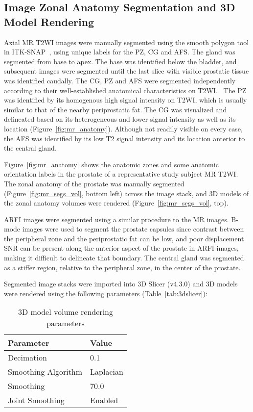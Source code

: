\subsection{Image Zonal Anatomy Segmentation and 3D Model Rendering}
Axial MR T2WI images were manually segmented using the smooth polygon tool in
ITK-SNAP~\cite{Yushkevich2006}, using unique labels for the PZ, CG and AFS. The
gland was segmented from base to apex.  The base was identified below the
bladder, and subsequent images were segmented until the last slice with visible
prostatic tissue was identified caudally. The CG, PZ and AFS were segmented
independently according to their well-established anatomical characteristics on
T2WI.~\cite{Verma2011,Jung2012,Poon1985,Hricak2007,Bonekamp2011} The PZ was
identified by its homogenous high signal intensity on T2WI, which is usually
similar to that of the nearby periprostatic fat. The CG was visualized and
delineated based on its heterogeneous and lower signal intensity as well as its
location (Figure~\ref{fig:mr_anatomy}). Although not readily visible on every
case, the AFS was identified by its low T2 signal intensity and its location
anterior to the central gland. 

Figure~\ref{fig:mr_anatomy} shows the anatomic zones and some anatomic
orientation labels in the prostate of a representative study subject MR T2WI.  The
zonal anatomy of the prostate was manually segmented
(Figure~\ref{fig:mr_segs_vol}, bottom left) across the image stack, and 3D
models of the zonal anatomy volumes were rendered
(Figure~\ref{fig:mr_segs_vol}, top).





ARFI images were segmented using a similar procedure to the MR images.  B-mode
images were used to segment the prostate capsules since contrast between the
peripheral zone and the periprostatic fat can be low, and poor displacement SNR
can be present along the anterior aspect of the prostate in ARFI images, making
it difficult to delineate that boundary.  The central gland was segmented as a
stiffer region, relative to the peripheral zone, in the center of the prostate.



Segmented image stacks were imported into 3D Slicer (v4.3.0) and 3D
models were rendered using the following parameters (Table~\ref{tab:3dslicer}):

\begin{table}[h!]
\centering
\caption{3D model volume rendering parameters}
\begin{tabular}{ll}
{\bf Parameter} & {\bf Value} \\ \hline
Decimation & 0.1 \\
Smoothing Algorithm & Laplacian \\
Smoothing  & 70.0 \\
Joint Smoothing & Enabled \\
\end{tabular}
\end{table}

